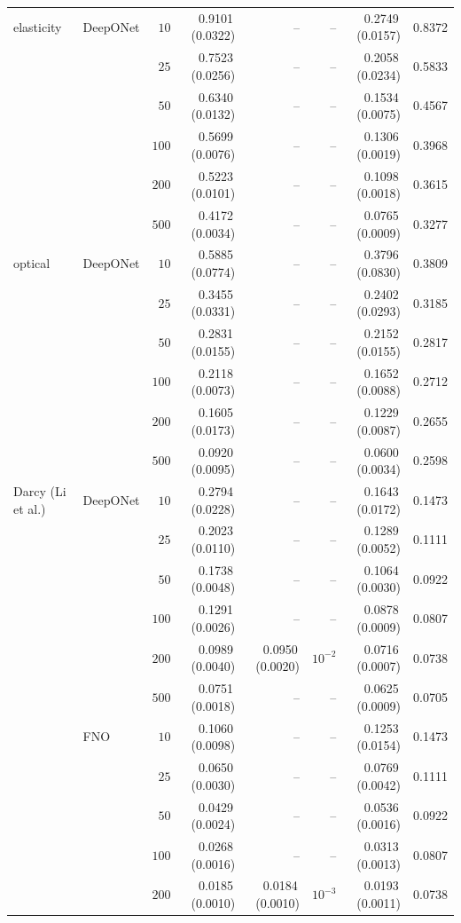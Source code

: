 \documentclass{article}
\begin{document}
{\begin{longtable}{llrrrrrr}
elasticity & DeepONet & $10$ & 0.9101\,(0.0322) & -- & -- & 0.2749\,(0.0157) & 0.8372\\
 &  & $25$ & 0.7523\,(0.0256) & -- & -- & 0.2058\,(0.0234) & 0.5833\\
 &  & $50$ & 0.6340\,(0.0132) & -- & -- & 0.1534\,(0.0075) & 0.4567\\
 &  & $100$ & 0.5699\,(0.0076) & -- & -- & 0.1306\,(0.0019) & 0.3968\\
 &  & $200$ & 0.5223\,(0.0101) & -- & -- & 0.1098\,(0.0018) & 0.3615\\
 &  & $500$ & 0.4172\,(0.0034) & -- & -- & 0.0765\,(0.0009) & 0.3277\\
optical & DeepONet & $10$ & 0.5885\,(0.0774) & -- & -- & 0.3796\,(0.0830) & 0.3809\\
 &  & $25$ & 0.3455\,(0.0331) & -- & -- & 0.2402\,(0.0293) & 0.3185\\
 &  & $50$ & 0.2831\,(0.0155) & -- & -- & 0.2152\,(0.0155) & 0.2817\\
 &  & $100$ & 0.2118\,(0.0073) & -- & -- & 0.1652\,(0.0088) & 0.2712\\
 &  & $200$ & 0.1605\,(0.0173) & -- & -- & 0.1229\,(0.0087) & 0.2655\\
 &  & $500$ & 0.0920\,(0.0095) & -- & -- & 0.0600\,(0.0034) & 0.2598\\
Darcy (Li et al.) & DeepONet & $10$ & 0.2794\,(0.0228) & -- & -- & 0.1643\,(0.0172) & 0.1473\\
 &  & $25$ & 0.2023\,(0.0110) & -- & -- & 0.1289\,(0.0052) & 0.1111\\
 &  & $50$ & 0.1738\,(0.0048) & -- & -- & 0.1064\,(0.0030) & 0.0922\\
 &  & $100$ & 0.1291\,(0.0026) & -- & -- & 0.0878\,(0.0009) & 0.0807\\
 &  & $200$ & 0.0989\,(0.0040) & 0.0950\,(0.0020) & $10^{-2}$ & 0.0716\,(0.0007) & 0.0738\\
 &  & $500$ & 0.0751\,(0.0018) & -- & -- & 0.0625\,(0.0009) & 0.0705\\
 & FNO & $10$ & 0.1060\,(0.0098) & -- & -- & 0.1253\,(0.0154) & 0.1473\\
 &  & $25$ & 0.0650\,(0.0030) & -- & -- & 0.0769\,(0.0042) & 0.1111\\
 &  & $50$ & 0.0429\,(0.0024) & -- & -- & 0.0536\,(0.0016) & 0.0922\\
 &  & $100$ & 0.0268\,(0.0016) & -- & -- & 0.0313\,(0.0013) & 0.0807\\
 &  & $200$ & 0.0185\,(0.0010) & 0.0184\,(0.0010) & $10^{-3}$ & 0.0193\,(0.0011) & 0.0738\\

\end{longtable}}
\end{document}
